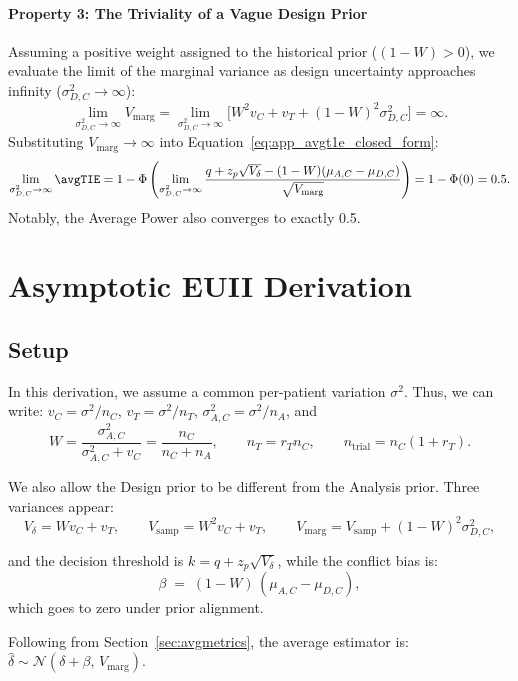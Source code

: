 \paragraph{Property 3: The Triviality of a Vague Design Prior}
Assuming a positive weight assigned to the historical prior ($(1 - W) > 0$), we evaluate the limit of the marginal variance as design uncertainty approaches infinity ($\sigma_{D,C}^2 \to \infty$):
$$
    \lim_{\sigma_{D,C}^2 \to \infty} V_{\text{marg}} = \lim_{\sigma_{D,C}^2 \to \infty} \Big[ W^2 v_C + v_T + (1 - W)^2 \sigma_{D,C}^2 \Big] = \infty.
$$
Substituting $V_{\text{marg}} \to \infty$ into Equation~\eqref{eq:app_avgt1e_closed_form}:
$$
    \lim_{\sigma_{D,C}^2 \to \infty} \avgTIE = 1 - \Phi\left( \lim_{\sigma_{D,C}^2 \to \infty} \frac{q + z_p \sqrt{V_{\delta}} - (1 - W)(\mu_{A,C} - \mu_{D,C})}{\sqrt{V_{\text{marg}}}} \right) = 1 - \Phi(0) = 0.5.
$$
Notably, the Average Power also converges to exactly 0.5.




\section{Asymptotic EUII Derivation}
\label{sec:app_asymptotic}

\subsection{Setup}
In this derivation, we assume a common per-patient variation $\sigma^2$. Thus, we can write: 
$v_C=\sigma^2/n_C$, $v_T=\sigma^2/n_T$, $\sigma_{A,C}^2=\sigma^2/n_A$, and 
\[
  W=\frac{\sigma_{A,C}^2}{\sigma_{A,C}^2+v_C}=\frac{n_C}{n_C+n_A},\qquad
  n_T=r_T n_C,\qquad n_{\mathrm{trial}}=n_C(1+r_T).
\]

We also allow the Design prior to be different from the Analysis prior.
Three variances appear: 
\begin{equation}\label{eq:vars}
  V_\delta = W v_C + v_T,\qquad
  V_{\mathrm{samp}} = W^2 v_C + v_T,\qquad
  V_{\mathrm{marg}} = V_{\mathrm{samp}} + (1-W)^2\sigma_{D,C}^2,
\end{equation}

and the decision threshold is $k=q+z_p\sqrt{V_\delta}$, while the conflict bias is:
\begin{equation}\label{eq:bias}
  \beta \;=\; (1-W)\,(\mu_{A,C}-\mu_{D,C}),
\end{equation}
which goes to zero under prior alignment.

Following from Section~\ref{sec:avgmetrics}, the average estimator is:
$\hat\delta\sim\mathcal N(\delta+\beta,\,V_{\mathrm{marg}})$.


